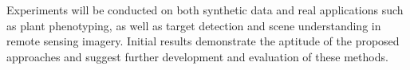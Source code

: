 Experiments will be conducted on both synthetic data and real applications such as plant phenotyping, as well as target detection and scene understanding in remote sensing imagery. Initial results demonstrate the aptitude of the proposed approaches and suggest further development and evaluation of these methods.




